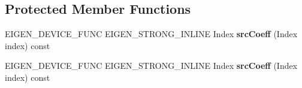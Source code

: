 \subsection*{Protected Member Functions}
\begin{DoxyCompactItemize}
\item 
\mbox{\label{struct_eigen_1_1_tensor_evaluator_3_01const_01_tensor_striding_op_3_01_strides_00_01_arg_type_01_4_00_01_device_01_4_a900ae574ed2b2c73397dbfe4d6e09353}} 
E\+I\+G\+E\+N\+\_\+\+D\+E\+V\+I\+C\+E\+\_\+\+F\+U\+NC E\+I\+G\+E\+N\+\_\+\+S\+T\+R\+O\+N\+G\+\_\+\+I\+N\+L\+I\+NE Index {\bfseries src\+Coeff} (Index index) const
\item 
\mbox{\label{struct_eigen_1_1_tensor_evaluator_3_01const_01_tensor_striding_op_3_01_strides_00_01_arg_type_01_4_00_01_device_01_4_a900ae574ed2b2c73397dbfe4d6e09353}} 
E\+I\+G\+E\+N\+\_\+\+D\+E\+V\+I\+C\+E\+\_\+\+F\+U\+NC E\+I\+G\+E\+N\+\_\+\+S\+T\+R\+O\+N\+G\+\_\+\+I\+N\+L\+I\+NE Index {\bfseries src\+Coeff} (Index index) const
\end{DoxyCompactItemize}

